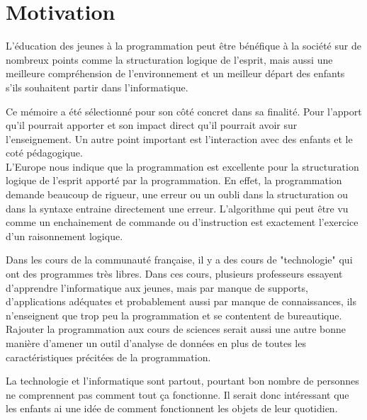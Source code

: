 \section{Motivation}
\label{intro-motivation}
L'éducation des jeunes à la programmation peut être bénéfique à la société sur de nombreux points comme la structuration logique de l'esprit, mais aussi une meilleure compréhension de l'environnement et un meilleur départ des enfants s'ils souhaitent partir dans l'informatique.

Ce mémoire a été sélectionné pour son côté concret dans sa finalité. Pour l'apport qu'il pourrait apporter et son impact direct qu'il pourrait avoir sur l'enseignement.
Un autre point important est l'interaction avec des enfants et le coté pédagogique.\\

L'Europe nous indique que la programmation est excellente pour la structuration logique de l'esprit apporté par la programmation. En effet, la programmation demande beaucoup de rigueur, une erreur ou un oubli dans la structuration ou dans la syntaxe entraine directement une erreur. L'algorithme qui peut être vu comme un enchainement de commande ou d'instruction est exactement l'exercice d'un raisonnement logique.

Dans les cours de la communauté française, il y a des cours de "technologie" qui ont des programmes très libres. Dans ces cours, plusieurs professeurs essayent d'apprendre l'informatique aux jeunes, mais par manque de supports, d'applications adéquates et probablement aussi par manque de connaissances, ils n'enseignent que trop peu la programmation et se contentent de bureautique. Rajouter la programmation aux cours de sciences serait aussi une autre bonne manière d'amener un outil d'analyse de données en plus de toutes les caractéristiques précitées de la programmation.

La technologie et l'informatique sont partout, pourtant bon nombre de personnes ne comprennent pas comment tout ça fonctionne. Il serait donc intéressant que les enfants ai une idée de comment fonctionnent les objets de leur quotidien.
